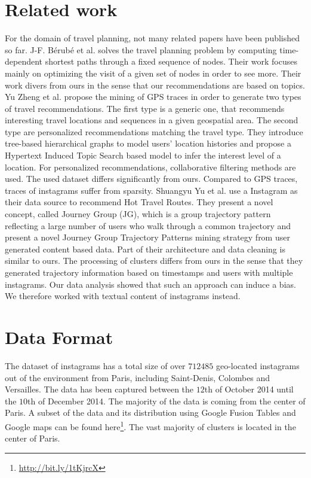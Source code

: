 \section{Related work}
For the domain of travel planning, not many related papers have been published so far. J-F. Bérubé et al. \cite{berube2006time} solves the travel planning problem by computing time-dependent shortest paths through a fixed sequence of nodes. Their work focuses mainly on optimizing the visit of a given set of nodes in order to see more. Their work divers from ours in the sense that our recommendations are based on topics. Yu Zheng et al. \cite{yuzhen} propose the mining of GPS traces in order to generate two types of travel recommendations. The first type is a generic one, that recommends interesting travel locations and sequences in a given geospatial area. The second type are personalized recommendations matching the travel type. They introduce tree-based hierarchical graphs to model users' location histories and propose a Hypertext Induced Topic Search based model to infer the interest level of a location. For personalized recommendations, collaborative filtering methods are used. The used dataset differs significantly from ours. Compared to GPS traces, traces of instagrams suffer from sparsity. Shuangyu Yu et al. \cite{Yu:2014:PDJ:2678534.2678823} use a Instagram as their data source to recommend Hot Travel Routes. They present a novel concept, called Journey Group (JG), which is a group trajectory pattern reflecting a large number of users who walk through a common trajectory and present a novel Journey Group Trajectory Patterns mining strategy from user generated content based data. Part of their architecture and data cleaning is similar to ours. The processing of clusters differs from ours in the sense that they generated trajectory information based on timestamps and users with multiple instagrams. Our data analysis showed that such an approach can induce a bias. We therefore worked with textual content of instagrams instead.


\section{Data Format}
\label{sct:data}

The dataset of instagrams has a total size of over $712485$ geo-located instagrams out of the environment from Paris, including Saint-Denis, Colombes and Versailles. The data has been captured between the $12$th of October 2014 until the $10$th of December 2014. The majority of the data is coming from the center of Paris. A subset of the data and its distribution using Google Fusion Tables and Google maps can be found here\footnote{\url{http://bit.ly/1tKjrcX}}. The vast majority of clusters is located in the center of Paris.

